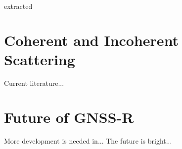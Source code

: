 \documentclass{article}
\begin{document}
\citeauthor{CYGNSS} extracted 
\section{Coherent and Incoherent Scattering}
Current literature...

\section{Future of GNSS-R}
More development is needed in...
The future is bright...

\clearpage
\printbibliography
\end{document}
